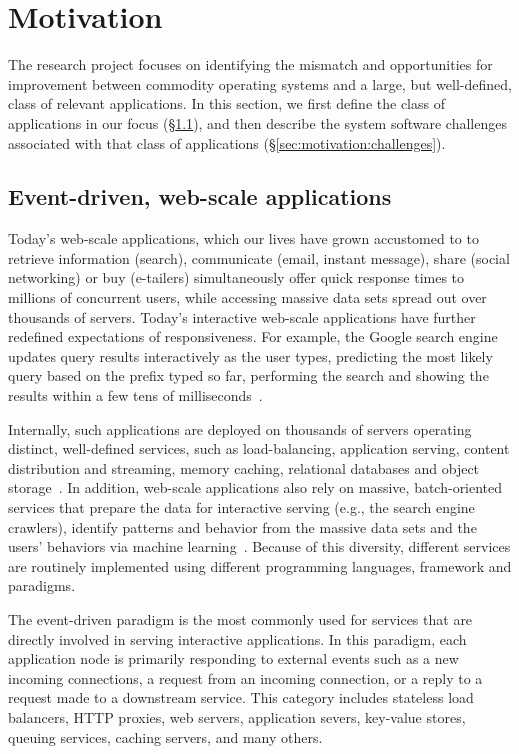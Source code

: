 
\section{Motivation}
\label{sec:motivation}

The research project focuses on identifying the mismatch and
opportunities for improvement between commodity operating systems and
a large, but well-defined, class of relevant applications.  In this
section, we first define the class of applications in our focus
(\S\ref{sec:motivation:web}), and then describe the system software
challenges associated with that class of applications
(\S\ref{sec:motivation:challenges}).

\subsection{Event-driven, web-scale applications}
\label{sec:motivation:web}

Today's web-scale applications, which our lives have grown accustomed
to to retrieve information (search), communicate (email, instant
message), share (social networking) or buy (e-tailers) simultaneously
offer quick response times to millions of concurrent users, while
accessing massive data sets spread out over thousands of servers.
Today's interactive web-scale applications have further redefined
expectations of responsiveness. For example, the Google search engine
updates query results interactively as the user types, predicting the
most likely query based on the prefix typed so far, performing the
search and showing the results within a few tens of
milliseconds~\cite{DBLP:journals/cacm/DeanB13}.

Internally, such applications are deployed on thousands of servers
operating distinct, well-defined services, such as load-balancing,
application serving, content distribution and streaming, memory
caching, relational databases and object storage~\cite{missing}.  In
addition, web-scale applications also rely on massive, batch-oriented
services that prepare the data for interactive serving (e.g., the
search engine crawlers), identify patterns and behavior from the
massive data sets and the users' behaviors via machine
learning~\cite{missing}.  Because of this diversity, different
services are routinely implemented using different programming
languages, framework and paradigms.

The event-driven paradigm is the most commonly used for services that
are directly involved in serving interactive applications.  In this
paradigm, each application node is primarily responding to external
events such as a new incoming connections, a request from an incoming
connection, or a reply to a request made to a downstream service.
This category includes stateless load balancers, HTTP proxies, web
servers, application severs, key-value stores, queuing services,
caching servers, and many others.  

